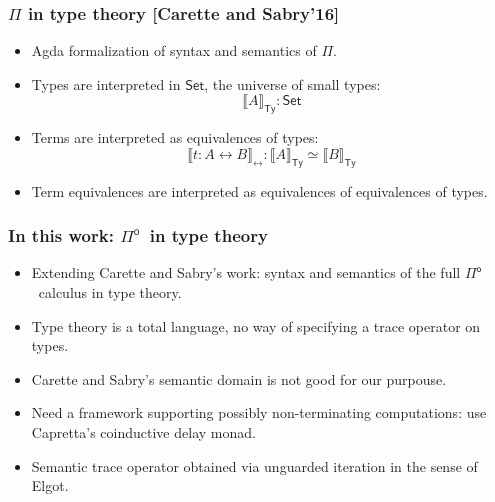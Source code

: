 \documentclass[12pt,t]{beamer}
\newcommand{\Pio}{\ensuremath{\mathsf{\Pi}^{\mathsf{o}}}}
\newcommand{\Set}{\mathsf{Set}}
\newcommand{\lr}{\longleftrightarrow}
\newcommand{\semTy}[1]{{\llbracket #1 \rrbracket}_\mathsf{Ty}}
\newcommand{\semTm}[1]{{\llbracket #1 \rrbracket}_{\lr}}
\begin{document}
\begin{frame}
  \frametitle{$\Pi$ in type theory [Carette and Sabry'16]}

  \begin{itemize}

  \item Agda formalization of syntax and
    semantics of $\Pi$.
  \item Types are interpreted in $\Set$, the universe of small types:
    \[
    \semTy A : \Set
    \]
  \item Terms are interpreted as equivalences of types:
    \[
    \semTm {t : A \lr B} : \semTy A \simeq \semTy B
    \]
  \item Term equivalences are interpreted as equivalences of
    equivalences of types.
  \end{itemize}
  
  
\end{frame}

\begin{frame}
  
  \frametitle{In this work: \Pio\ in type theory}

  \begin{itemize}
  \item Extending Carette and Sabry's work: syntax and semantics of
    the full \Pio\ calculus in type theory.
  \item Type theory is a total language, no way of specifying a trace
    operator on types.
  \item Carette and Sabry's semantic domain is not good for our
    purpouse.
    \pause
    \vspace{\fill}
  \item Need a framework supporting possibly non-terminating
    computations: use Capretta's coinductive delay monad.
   \item Semantic trace operator obtained via unguarded iteration in
     the sense of Elgot.
  \end{itemize}
  
\end{frame}
\end{document}
